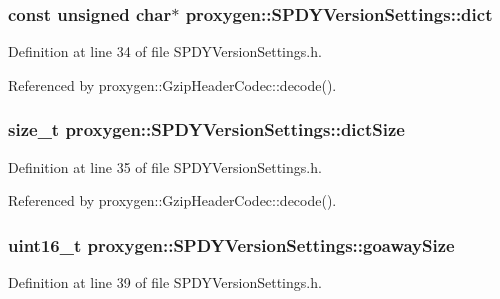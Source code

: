 \subsubsection[{dict}]{\setlength{\rightskip}{0pt plus 5cm}const unsigned char$\ast$ proxygen\+::\+S\+P\+D\+Y\+Version\+Settings\+::dict}\label{structproxygen_1_1SPDYVersionSettings_acd8ca16d74f7c025e9c25be07de67b0e}


Definition at line 34 of file S\+P\+D\+Y\+Version\+Settings.\+h.



Referenced by proxygen\+::\+Gzip\+Header\+Codec\+::decode().

\subsubsection[{dict\+Size}]{\setlength{\rightskip}{0pt plus 5cm}size\+\_\+t proxygen\+::\+S\+P\+D\+Y\+Version\+Settings\+::dict\+Size}\label{structproxygen_1_1SPDYVersionSettings_a08599d561a37456bcb83d08a9b88511f}


Definition at line 35 of file S\+P\+D\+Y\+Version\+Settings.\+h.



Referenced by proxygen\+::\+Gzip\+Header\+Codec\+::decode().

\subsubsection[{goaway\+Size}]{\setlength{\rightskip}{0pt plus 5cm}uint16\+\_\+t proxygen\+::\+S\+P\+D\+Y\+Version\+Settings\+::goaway\+Size}\label{structproxygen_1_1SPDYVersionSettings_a06aafc19620d2878f01bb73acb234036}


Definition at line 39 of file S\+P\+D\+Y\+Version\+Settings.\+h.



